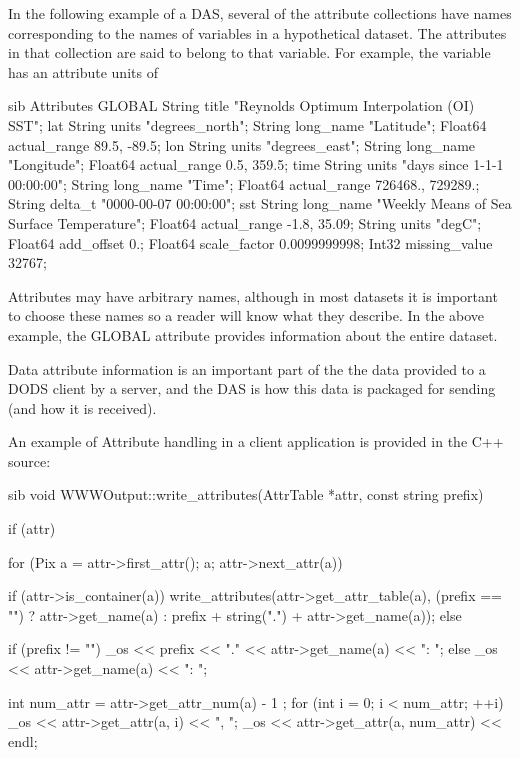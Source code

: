 \documentclass{dods-paper}
\begin{document}
In the following example of a DAS, several of the attribute
collections have names corresponding to the names of variables in a
hypothetical dataset. The attributes in that collection are said to
belong to that variable. For example, the  variable has an
attribute units of 

\begin{vcode}{sib}
 Attributes {
    GLOBAL {
       String title "Reynolds Optimum Interpolation (OI) SST";
    }
    lat {
       String units "degrees_north";
       String long_name "Latitude";
       Float64 actual_range 89.5, -89.5;
    }
    lon {
       String units "degrees_east";
       String long_name "Longitude";
       Float64 actual_range 0.5, 359.5;
    }
    time {
       String units "days since 1-1-1 00:00:00";
       String long_name "Time";
       Float64 actual_range 726468., 729289.;
       String delta_t "0000-00-07 00:00:00";
    }
    sst {
       String long_name "Weekly Means of Sea Surface Temperature";
       Float64 actual_range -1.8, 35.09;
       String units "degC";
       Float64 add_offset 0.;
       Float64 scale_factor 0.0099999998;
       Int32 missing_value 32767;
   }
 }
\end{vcode}

Attributes may have arbitrary names, although in most datasets it is
important to choose these names so a reader will know what they
describe. In the above example, the GLOBAL attribute provides
information about the entire dataset.

Data attribute information is an important part of the the data
provided to a DODS client by a server, and the DAS is how this data is
packaged for sending (and how it is received).

An example of Attribute handling in a client application is provided in
the  C++ source:

\begin{vcode}{sib}
void
WWWOutput::write_attributes(AttrTable *attr, const string prefix)
{
    if (attr) {
        for (Pix a = attr->first_attr(); a; attr->next_attr(a)) {
            if (attr->is_container(a))
                write_attributes(attr->get_attr_table(a), 
                                 (prefix == "") ? attr->get_name(a) 
                                 : prefix + string(".") + attr->get_name(a));
            else {
                if (prefix != "")
                    _os << prefix << "." << attr->get_name(a) << ": ";
                else
                    _os << attr->get_name(a) << ": ";

                int num_attr = attr->get_attr_num(a) - 1 ;
                for (int i = 0; i < num_attr; ++i)
                    _os << attr->get_attr(a, i) << ", ";
                _os << attr->get_attr(a, num_attr) << endl;
            }
        }
    }
}
\end{vcode}
\end{document}
